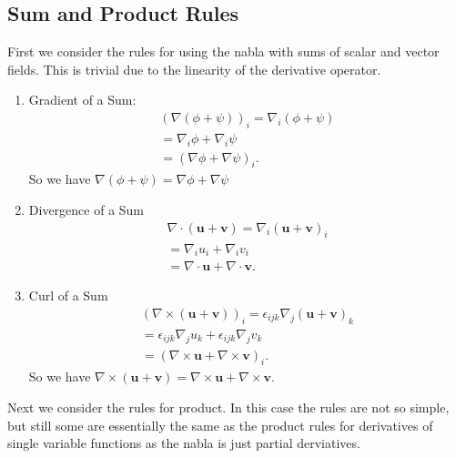 \documentclass[]{article}
\begin{document}
\subsection{Sum and Product Rules}

First we consider the rules for using the nabla with sums of scalar and vector fields. This is trivial due to the linearity of the derivative operator.

\begin{enumerate}
		\item Gradient of a Sum: 
				\begin{align*}
						(\nabla (\phi + \psi))_i = \nabla_i (\phi + \psi) \\
						= \nabla_i \phi + \nabla_i \psi \\
						= (\nabla \phi + \nabla \psi)_i.
				\end{align*}
				So we have $\nabla(\phi + \psi) = \nabla\phi + \nabla\psi$
		\item Divergence of a Sum
				\begin{align*}
						\nabla \cdot (\mathbf{u} + \mathbf{v}) = \nabla_i (\mathbf{u} + \mathbf{v})_i \\
						= \nabla_i u_i + \nabla_i v_i \\
						= \nabla \cdot \mathbf{u} + \nabla \cdot \mathbf{v}.
				\end{align*}
		\item Curl of a Sum
				\begin{align*}
						(\nabla \times (\mathbf{u} + \mathbf{v}))_i = \epsilon_{ijk} \nabla_j (\mathbf{u} + \mathbf{v})_k \\
						= \epsilon_{ijk} \nabla_j u_k + \epsilon_{ijk} \nabla_j v_k \\
						= (\nabla \times \mathbf{u} + \nabla \times \mathbf{v})_i.
				\end{align*}
				So we have $\nabla \times (\mathbf{u} + \mathbf{v}) = \nabla \times \mathbf{u} + \nabla \times \mathbf{v}$.
\end{enumerate}

Next we consider the rules for product. In this case the rules are not so simple, but still some are essentially the same as the product rules for derivatives of single variable functions as the nabla is just partial derviatives.
\end{document}
